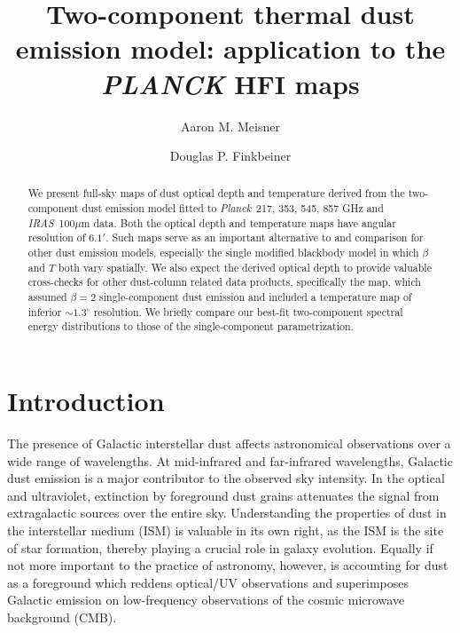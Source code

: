\documentclass{emulateapj}
\newcommand{\IRAS}{{\it IRAS}}
\newcommand{\PLANCK}{{\it Planck}}
\begin{document}
 

\title{Two-component thermal dust emission model: application to the {\it PLANCK} HFI maps}
\author{Aaron M. Meisner}
\author{Douglas P. Finkbeiner}

\begin{abstract}
We present full-sky maps of dust optical depth and temperature derived from 
the \cite{FDS99} two-component dust emission model fitted to \PLANCK~217, 353, 
545, 857 GHz and \cite{SFD} \IRAS~100$\mu$m data. Both the optical 
depth and temperature maps have angular resolution of $6.1'$. Such maps serve 
as an important alternative to and comparison for other dust 
emission models, especially the single modified blackbody model in which 
$\beta$ and $T$ both vary spatially. We also expect the derived optical 
depth to provide valuable cross-checks for other dust-column related data 
products, specifically the \cite{SFD} map, which assumed 
$\beta = 2$ single-component dust emission and included a temperature map of 
inferior $\sim$$1.3^{\circ}$ resolution. We briefly compare our 
best-fit two-component spectral energy distributions to those of the 
\cite{planckdust} single-component parametrization.
\end{abstract}

\section{Introduction}
The presence of Galactic interstellar dust affects
astronomical observations over a wide range of wavelengths. At mid-infrared
and far-infrared wavelengths, Galactic dust emission is a major contributor
to the observed sky intensity. In the optical and ultraviolet, extinction
by foreground dust grains attenuates the signal from extragalactic sources
over the entire sky. Understanding the properties of dust in the interstellar 
medium (ISM) is valuable in its own right, as the ISM is the site of star 
formation, thereby playing a crucial role in galaxy evolution. Equally if not 
more important to the practice of astronomy, however, is accounting for dust 
as a foreground which reddens optical/UV observations and superimposes 
Galactic emission on low-frequency observations of the 
cosmic microwave background (CMB). %
\end{document}
